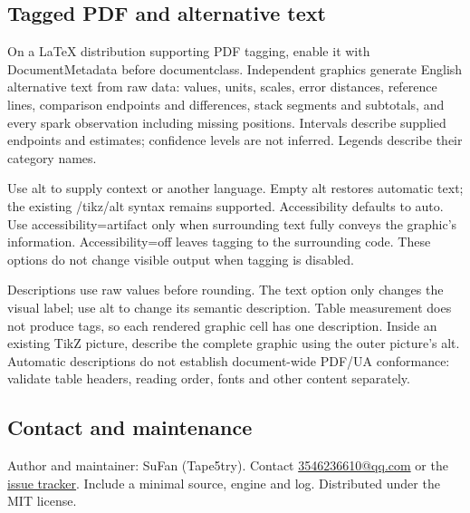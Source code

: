 \subsection{Tagged PDF and alternative text}
On a LaTeX distribution supporting PDF tagging, enable it with DocumentMetadata
before documentclass. Independent graphics generate English alternative text from
raw data: values, units, scales, error distances, reference lines, comparison
endpoints and differences, stack segments and subtotals, and every spark observation
including missing positions. Intervals describe supplied endpoints and estimates;
confidence levels are not inferred. Legends describe their category names.

Use alt to supply context or another language. Empty alt restores automatic text;
the existing /tikz/alt syntax remains supported. Accessibility defaults to auto.
Use accessibility=artifact only when surrounding text fully conveys the graphic's
information. Accessibility=off leaves tagging to the surrounding code. These options
do not change visible output when tagging is disabled.

Descriptions use raw values before rounding. The text option only changes the
visual label; use alt to change its semantic description. Table measurement does
not produce tags, so each rendered graphic cell has one description. Inside an
existing TikZ picture, describe the complete graphic using the outer picture's alt.
Automatic descriptions do not establish document-wide PDF/UA conformance: validate
table headers, reading order, fonts and other content separately.

\subsection*{Contact and maintenance}
Author and maintainer: SuFan (Tape5try).
Contact \href{mailto:3546236610@qq.com}{3546236610@qq.com} or the
\href{https://github.com/Tape5try/gradbars/issues}{issue tracker}.
Include a minimal source, engine and log. Distributed under the MIT license.
